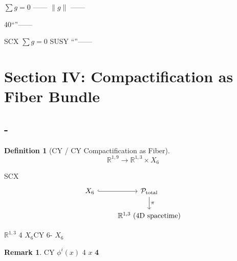\documentclass[12pt,a4paper]{article}
\theoremstyle{plain}
\theoremstyle{definition}
\newtheorem{definition}[theorem]{ Definition}
\newtheorem{remark}[theorem]{ Remark}
\newcommand{\R}{\mathbb{R}}
\newcommand{\Pcal}{\mathcal{P}}
\begin{document}
\begin{scxbox}
$\sum g = 0$ \textbf{}
——
 $\|g\|$ 
——\textbf{}
\end{scxbox}

\begin{honestcrit}
40``''——

SCX  $\sum g = 0$ 
 SUSY 
``''——

\end{honestcrit}

\newpage


\section{}
\section*{Section IV: Compactification as Fiber Bundle}

\subsection{-}

\begin{definition}[CY  / CY Compactification as Fiber]

\begin{equation}
    \R^{1,9} \to \R^{1,3} \times X_6
\end{equation}

 SCX 
\begin{equation}
    \begin{tikzcd}
        X_6 \arrow[r, hook] & \Pcal_{\text{total}} \arrow[d, "\pi"] \\
        & \R^{1,3} \text{ (4D spacetime)}
    \end{tikzcd}
\end{equation}

 $\R^{1,3}$ 4 $X_6$CY 6-
 $X_6$ \textbf{}
\end{definition}

\begin{remark}
 CY 
 $\phi^i(x)$ 4 $x$ 
\textbf{4}
\end{remark}

\end{document}
